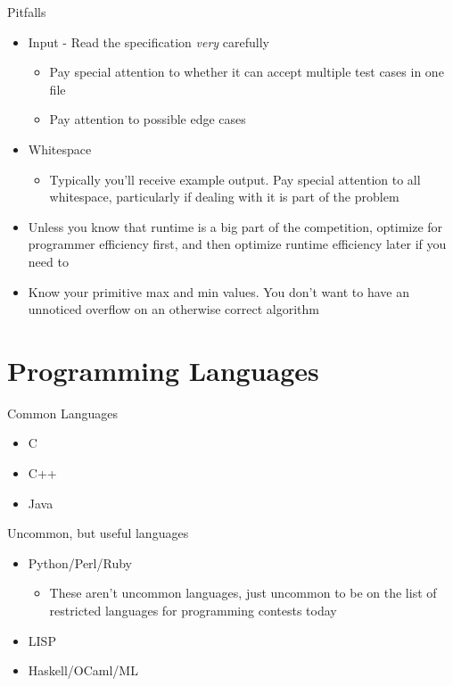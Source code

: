 \documentclass{beamer}
\begin{document}
\begin{frame}{Pitfalls}
  \begin{centering}
    \begin{itemize}
      \item Input - Read the specification \textit{very} carefully
      \begin{itemize}
        \item Pay special attention to whether it can accept multiple test cases in one file
        \item Pay attention to possible edge cases
      \end{itemize}
      \item Whitespace
      \begin{itemize}
        \item Typically you'll receive example output. Pay special attention to all whitespace, particularly if dealing with it is part of the problem
      \end{itemize}

      \item Unless you know that runtime is a big part of the competition, optimize for programmer efficiency first, and then optimize runtime efficiency later if you need to
      \item Know your primitive max and min values. You don't want to have an unnoticed overflow on an otherwise correct algorithm 
    \end{itemize}
  \end{centering}
\end{frame}

\section{Programming Languages}

\begin{frame}{Common Languages}
  \begin{centering}
    \begin{itemize}
     \item C
     \item C++
     \item Java
    \end{itemize}
  \end{centering}
\end{frame}

\begin{frame}{Uncommon, but useful languages}
  \begin{centering}
    \begin{itemize}
      \item Python/Perl/Ruby
      \begin{itemize}
        \item These aren't uncommon languages, just uncommon to be on the list of restricted languages for programming contests today
      \end{itemize}
      \item LISP
      \item Haskell/OCaml/ML
    \end{itemize}
  \end{centering}
\end{frame}
\end{document}
